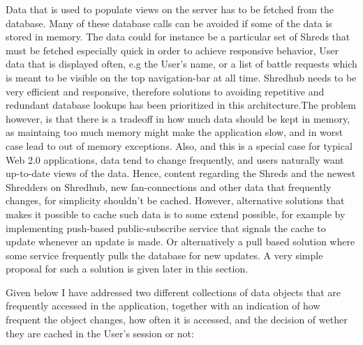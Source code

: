 Data that is used to populate views on the server has to be fetched from the database. Many of these database calls can be avoided if some of the data is stored in memory. The data could for instance be a particular set of Shreds that must be fetched especially quick in order to achieve responsive behavior, User data that is displayed often, e.g the User's name, or a list of battle requests which is meant to be visible on the top navigation-bar at all time. Shredhub needs to be very efficient and responsive, therefore solutions to avoiding repetitive and redundant database lookups has been prioritized in this architecture.The problem however, is that there is a tradeoff in how much data should be kept in memory, as maintaing too much memory might make the application slow, and in worst case lead to out of memory exceptions. Also, and this is a special case for typical Web 2.0 applications, data tend to change frequently, and users naturally want up-to-date views of the data. Hence, content regarding the Shreds and the newest Shredders on Shredhub, new fan-connections and other data that frequently changes, for simplicity shouldn't be cached. However, alternative solutions that makes it possible to cache such data is to some extend possible, for example by implementing push-based public-subscribe service that signals the cache to update whenever an update is made. Or alternatively a pull based solution where some service frequently pulls the database for new updates. A very simple proposal for such a solution is given later in this section.

Given below I have addressed two different collections of data objects that are frequently accessed in the application, together with an indication of how frequent the object changes, how often it is accessed, and the decision of wether they are cached in the User's session or not:
	
